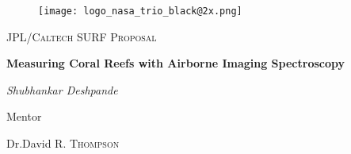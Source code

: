 \documentclass{article}
\begin{document}
\begin{titlepage}
	\centering
	\begin{figure}[H]
	\centering
	\texttt{[image: logo\_nasa\_trio\_black@2x.png]}
	\end{figure}
	\vspace{2cm}
	{\scshape\LARGE JPL/Caltech SURF Proposal \par}
	\vspace{2cm}
	{\huge\bfseries Measuring Coral Reefs with Airborne Imaging Spectroscopy\par}
	\vspace{2cm}
	{\Large\itshape Shubhankar Deshpande\par}
	\vfill
	Mentor\par
	Dr.David R. \textsc{Thompson}

	\vfill

\end{titlepage}
\end{document}
